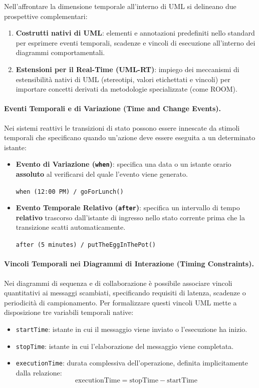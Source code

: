 \documentclass[12pt]{extarticle}
\begin{document}
\noindent Nell'affrontare la dimensione temporale all'interno di UML si delineano due prospettive complementari:
\begin{enumerate}
    \item \textbf{Costrutti nativi di UML}: elementi e annotazioni predefiniti nello standard per esprimere eventi temporali, scadenze e vincoli di esecuzione all'interno dei diagrammi comportamentali.
    \item \textbf{Estensioni per il Real-Time (UML-RT)}: impiego dei meccanismi di estensibilità nativi di UML (stereotipi, valori etichettati e vincoli) per importare concetti derivati da metodologie specializzate (come ROOM).
\end{enumerate}

\paragraph{Eventi Temporali e di Variazione (Time and Change Events).}
Nei sistemi reattivi le transizioni di stato possono essere innescate da stimoli temporali che specificano quando un'azione deve essere eseguita a un determinato istante:
\begin{itemize}
    \item \textbf{Evento di Variazione (\texttt{when})}: specifica una data o un istante orario \textbf{assoluto} al verificarsi del quale l'evento viene generato.
    \begin{center}
        \texttt{when (12:00 PM) / goForLunch()}
    \end{center}
    \item \textbf{Evento Temporale Relativo (\texttt{after})}: specifica un intervallo di tempo \textbf{relativo} trascorso dall'istante di ingresso nello stato corrente prima che la transizione scatti automaticamente.
    \begin{center}
        \texttt{after (5 minutes) / putTheEggInThePot()}
    \end{center}
\end{itemize}

\paragraph{Vincoli Temporali nei Diagrammi di Interazione (Timing Constraints).}
Nei diagrammi di sequenza e di collaborazione è possibile associare vincoli quantitativi ai messaggi scambiati, specificando requisiti di latenza, scadenze o periodicità di campionamento.
Per formalizzare questi vincoli UML mette a disposizione tre variabili temporali native:
\begin{itemize}
    \item \texttt{startTime}: istante in cui il messaggio viene inviato o l'esecuzione ha inizio.
    \item \texttt{stopTime}: istante in cui l'elaborazione del messaggio viene completata.
    \item \texttt{executionTime}: durata complessiva dell'operazione, definita implicitamente dalla relazione:
    $$\text{executionTime} = \text{stopTime} - \text{startTime}$$
\end{itemize}
\end{document}
